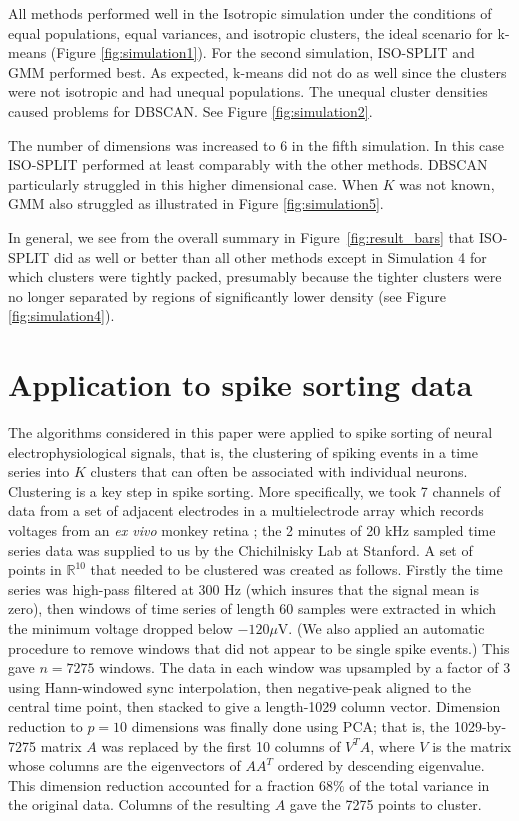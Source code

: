 \documentclass[10pt]{article}
\begin{document}
All methods performed well in the Isotropic simulation under the conditions of equal populations, equal variances, and isotropic clusters, the ideal scenario for k-means (Figure \ref{fig:simulation1}).
For the second simulation, ISO-SPLIT and GMM performed best. As expected, k-means did not do as well since the clusters were not isotropic and had unequal populations. The unequal cluster densities caused problems for DBSCAN. See Figure \ref{fig:simulation2}.

The number of dimensions was increased to $6$ in the fifth simulation. In this case ISO-SPLIT performed at least comparably with the other methods. DBSCAN particularly struggled in this higher dimensional case. When $K$ was not known, GMM also struggled as illustrated in Figure \ref{fig:simulation5}.

In general, we see from the overall summary in Figure~\ref{fig:result_bars} that ISO-SPLIT did as well or better than all other methods except in Simulation 4 for which clusters were tightly packed, presumably because the tighter clusters were no longer separated by regions of significantly lower density (see Figure \ref{fig:simulation4}).

\section {Application to spike sorting data}
\label{s:spike}

The algorithms considered in this paper were applied to spike sorting of neural electrophysiological signals, that is, the clustering of spiking events in a time series into $K$ clusters that can often be associated with individual neurons. Clustering is a key step in spike sorting. More specifically, we took 7 channels of data from a set of adjacent electrodes in a multielectrode array which records voltages from an {\em ex vivo} monkey retina \citep{litke}; the 2 minutes of 20 kHz sampled time series data was supplied to us by the Chichilnisky Lab at Stanford. A set of points in $\mathbb{R}^{10}$ that needed to be clustered was created as follows. Firstly the time series was high-pass filtered at 300 Hz (which insures that the signal mean is zero), then windows of time series of length 60 samples were extracted in which the minimum voltage dropped below $-120 \mu$V. (We also applied an automatic procedure to remove windows that did not appear to be single spike events.) This gave $n=7275$ windows. The data in each window was upsampled by a factor of 3 using Hann-windowed sync interpolation, then negative-peak aligned to the central time point, then stacked to give a length-1029 column vector. Dimension reduction to $p=10$ dimensions was finally done using PCA; that is, the 1029-by-7275 matrix $A$ was replaced by the first 10 columns of $V^T A$, where $V$ is the matrix 
whose columns are the eigenvectors of $AA^T$ ordered by descending eigenvalue.
This dimension reduction accounted for a fraction $68\%$ of the total variance in the original data.
Columns of the resulting $A$ gave the 7275 points to cluster.
\end{document}
